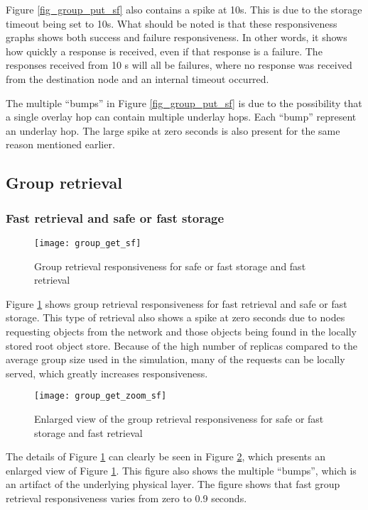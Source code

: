 Figure \ref{fig_group_put_sf} also contains a spike at 10s. This is due to the storage timeout being set to 10s. What should be noted is that these responsiveness graphs shows both success and failure responsiveness. In other words, it shows how quickly a response is received, even if that response is a failure. The responses received from 10 s will all be failures, where no response was received from the destination node and an internal timeout occurred.

The multiple ``bumps'' in Figure \ref{fig_group_put_sf} is due to the possibility that a single overlay hop can contain multiple underlay hops. Each ``bump'' represent an underlay hop. The large spike at zero seconds is also present for the same reason mentioned earlier.

\subsection{Group retrieval}
\subsubsection{Fast retrieval and safe or fast storage}
\begin{figure}[htbp]
 \centering
 \texttt{[image: group\_get\_sf]}
 \caption{Group retrieval responsiveness for safe or fast storage and fast retrieval}
 \label{fig_group_get_sf}
\end{figure}
%
Figure \ref{fig_group_get_sf} shows group retrieval responsiveness for fast retrieval and safe or fast storage. This type of retrieval also shows a spike at zero seconds due to nodes requesting objects from the network and those objects being found in the locally stored root object store. Because of the high number of replicas compared to the average group size used in the simulation, many of the requests can be locally served, which greatly increases responsiveness.

\begin{figure}[htbp]
 \centering
 \texttt{[image: group\_get\_zoom\_sf]}
 \caption{Enlarged view of the group retrieval responsiveness for safe or fast storage and fast retrieval}
 \label{fig_group_get_zoom_sf}
\end{figure}
%
The details of Figure \ref{fig_group_get_sf} can clearly be seen in Figure \ref{fig_group_get_zoom_sf}, which presents an enlarged view of Figure \ref{fig_group_get_sf}. This figure also shows the multiple ``bumps'', which is an artifact of the underlying physical layer. The figure shows that fast group retrieval responsiveness varies from zero to 0.9 seconds.

